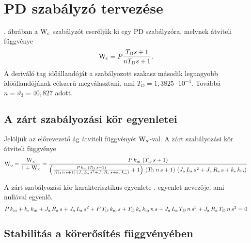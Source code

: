 \section{PD szabályzó tervezése}


. ábrában a $\mathrm{W}_\text{c}$ szabályzót cseréljük ki
egy PD szabályzóra, melynek átviteli függvénye
\begin{equation}
	\mathrm{W}_\text{c} = P\frac{T_\text{D}s+1}{nT_\text{D}s+1}.
\end{equation}
A deriváló tag időállandóját a szabályozott szakasz második legnagyobb időállandójának
célszerű megválasztani, ami $T_\text{D} = 1,3825\cdot 10^{-4}$.
Továbbá $n=\vartheta_3=40,827$ adott.


\subsection{A zárt szabályozási kör egyenletei}

Jelöljük az előrevezető ág átviteli függvényét $\mathrm{W}_\text{x}$-val.
A zárt szabályozási kör átviteli függvénye
\begin{equation}\label{eq:W-x}
	\mathrm{W}_\text{o} = \frac{\mathrm{W}_\text{x}}{1 + \mathrm{W}_\text{x}} =
	\frac{P\, k_\text{m}\, \left(T_\text{D}\, s + 1\right)}{\left(\frac{P\, k_\text{m}\, \left(T_\text{D}\, s + 1\right)}{\left(T_\text{D}\, n\, s + 1\right)\, \left(J_\text{a}\, L_\text{a}\, s^2 + J_\text{a}\, R_\text{a}\, s + k_\text{e}\, k_\text{m}\right)} + 1\right)\, \left(T_\text{D}\, n\, s + 1\right)\, \left(J_\text{a}\, L_\text{a}\, s^2 + J_\text{a}\, R_\text{a}\, s + k_\text{e}\, k_\text{m}\right)}
\end{equation}

A zárt szabályozási kör karakterisztikus egyenlete . egyenlet nevezője,
ami nullával egyenlő.
\begin{equation}
	P\, k_\text{m} + k_\text{e}\, k_\text{m} + J_\text{a}\, R_\text{a}\, s + J_\text{a}\, L_\text{a}\, s^2 + P\, T_\text{D}\, k_\text{m}\, s + T_\text{D}\, k_\text{e}\, k_\text{m}\, n\, s + J_\text{a}\, L_\text{a}\, T_\text{D}\, n\, s^3 + J_\text{a}\, R_\text{a}\, T_\text{D}\, n\, s^2 = 0
\end{equation}

\subsection{Stabilitás a körerősítés függvényében}

